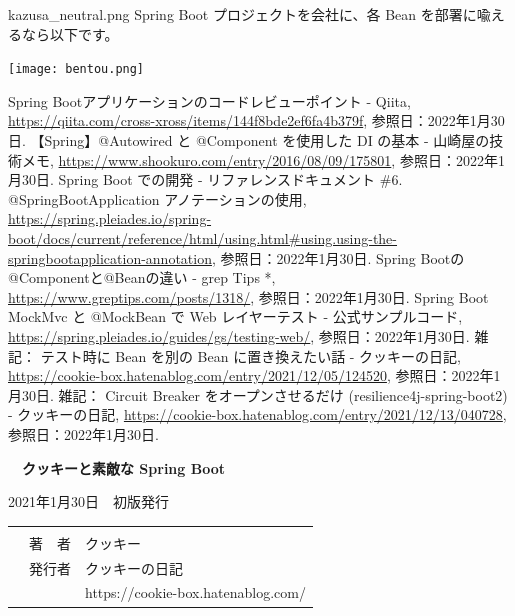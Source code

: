 \documentclass[b5paper,xelatex,ja=standard,10pt]{bxjsarticle}
\begin{document}
\begin{SERIFU}[colback=PaleIris, colbacktitle=PaleIris2]{kazusa_neutral.png}
Spring Boot プロジェクトを会社に、各 Bean を部署に喩えるなら以下です。
\end{SERIFU}

\texttt{[image: bentou.png]}


\begin{thebibliography}{99}
     Spring Bootアプリケーションのコードレビューポイント - Qiita, \url{https://qiita.com/cross-xross/items/144f8bde2ef6fa4b379f}, 参照日：2022年1月30日.
     【Spring】@Autowired と @Component を使用した DI の基本 - 山崎屋の技術メモ, \url{https://www.shookuro.com/entry/2016/08/09/175801}, 参照日：2022年1月30日.
     Spring Boot での開発 - リファレンスドキュメント \#6. @SpringBootApplication アノテーションの使用, \url{https://spring.pleiades.io/spring-boot/docs/current/reference/html/using.html#using.using-the-springbootapplication-annotation}, 参照日：2022年1月30日.
     Spring Bootの@Componentと@Beanの違い - grep Tips *, \url{https://www.greptips.com/posts/1318/}, 参照日：2022年1月30日.
     Spring Boot MockMvc と @MockBean で Web レイヤーテスト - 公式サンプルコード, \url{https://spring.pleiades.io/guides/gs/testing-web/}, 参照日：2022年1月30日.
     雑記： テスト時に Bean を別の Bean に置き換えたい話 - クッキーの日記, \url{https://cookie-box.hatenablog.com/entry/2021/12/05/124520}, 参照日：2022年1月30日.
     雑記： Circuit Breaker をオープンさせるだけ (resilience4j-spring-boot2) - クッキーの日記, \url{https://cookie-box.hatenablog.com/entry/2021/12/13/040728}, 参照日：2022年1月30日.
\end{thebibliography}


\clearpage
\vspace*{16.5cm} %
　\textbf{\large クッキーと素敵な Spring Boot}
\vspace*{-0.27cm}
\begin{OKUDUKE}[title={未完成ドラフト}]
2021年1月30日　初版発行 \\
{
\renewcommand\arraystretch{0.9}
\begin{tabular}{p{4cm}rp{5.9cm}}
 &  &  \\
 & 著　者 & クッキー \\
 & 発行者 & クッキーの日記 \\
 & & https://cookie-box.hatenablog.com/ 
\end{tabular}
}
\end{OKUDUKE}
\thispagestyle{empty}
\end{document}
